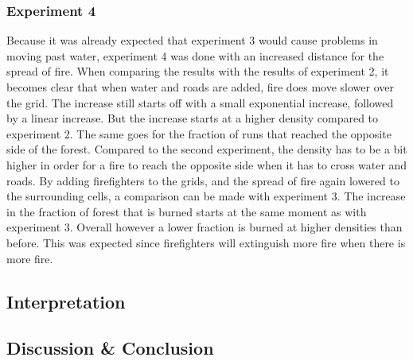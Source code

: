 \documentclass{article}
\begin{document}
\begin{multicols}{2}
\subsubsection*{Experiment 4}
Because it was already expected that experiment 3 would cause problems in moving past water, experiment 4 was done with an increased distance for the spread of fire. When comparing the results with the results of experiment 2, it becomes clear that when water and roads are added, fire does move slower over the grid. The increase still starts off with a small exponential increase, followed by a linear increase. But the increase starts at a higher density compared to experiment 2. The same goes for the fraction of runs that reached the opposite side of the forest. Compared to the second experiment, the density has to be a bit higher in order for a fire to reach the opposite side when it has to cross water and roads.
By adding firefighters to the grids, and the spread of fire again lowered to the surrounding cells, a comparison can be made with experiment 3. The increase in the fraction of forest that is burned starts at the same moment as with experiment 3. Overall however a lower fraction is burned at higher densities than before. This was expected since firefighters will extinguish more fire when there is more fire.
\subsection*{Interpretation}

\subsection*{Discussion \& Conclusion}

\nocite{*}


\end{multicols}
\end{document}
